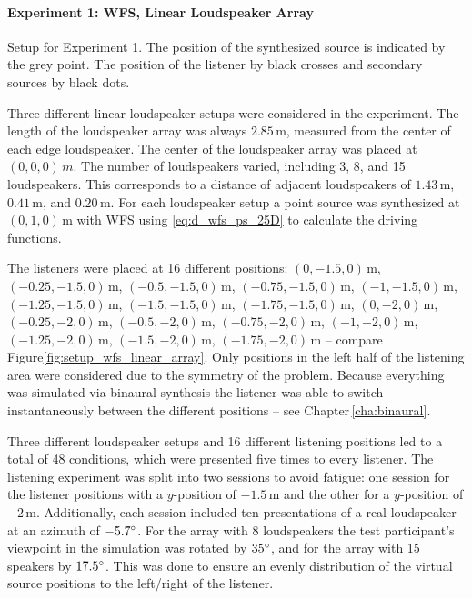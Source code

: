 \paragraph{Experiment 1: \ac{WFS}, Linear Loudspeaker Array}
\label{sec:experiment1_wfs_linear_array}
%
\begin{marginfigure}
    \ft
    
    \caption{Setup for Experiment 1. The position of the synthesized
    source is indicated by the grey point. The position of the listener by black
    crosses and secondary sources by black dots.
        }
    \label{fig:setup_wfs_linear_array}
\end{marginfigure}
%
Three different linear loudspeaker setups were considered in the experiment. The
length of the loudspeaker array was always $2.85$\,m, measured from the center
of each edge loudspeaker. The center of the loudspeaker array was placed at
$(0,0,0)\,m$. The number of loudspeakers varied,
including 3, 8, and 15 loudspeakers. This corresponds to a distance of
adjacent loudspeakers of $1.43$\,m, $0.41$\,m, and $0.20$\,m. For each loudspeaker
setup a point source was synthesized at $(0,1,0)$\,m with \ac{WFS}
using \eqref{eq:d_wfs_ps_25D} to calculate the driving functions.

The listeners were placed at 16 different positions: $(0,-1.5,0)$\,m,
$(-0.25,-1.5,0)$\,m, $(-0.5,-1.5,0)$\,m, $(-0.75,-1.5,0)$\,m,
$(-1,-1.5,0)$\,m,
$(-1.25,-1.5,0)$\,m, $(-1.5,-1.5,0)$\,m, $(-1.75,-1.5,0)$\,m, $(0,-2,0)$\,m,
$(-0.25,-2,0)$\,m, $(-0.5,-2,0)$\,m, $(-0.75,-2,0)$\,m, $(-1,-2,0)$\,m,
\linebreak
$(-1.25,-2,0)$\,m, $(-1.5,-2,0)$\,m, $(-1.75,-2,0)$\,m  -- compare
Figure\ref{fig:setup_wfs_linear_array}.
Only positions in the left half of the listening area were considered due to the
symmetry of the problem.
Because everything was simulated via
binaural synthesis the listener was able to switch instantaneously between the
different positions -- see Chapter\,\ref{cha:binaural}.

Three different loudspeaker setups and 16 different listening positions
led to a total of 48 conditions, which were presented five times to every
listener. The listening experiment was split into two sessions to avoid fatigue:
one session for the listener positions with a $y$-position of $-1.5$\,m and
the other for a $y$-position of $-2$\,m. Additionally, each session
included ten presentations of a real loudspeaker at an azimuth of
$-5.7^\circ$.
For the array with 8 loudspeakers the test participant's viewpoint in the simulation
was rotated by $35^\circ$, and for the array with 15 speakers by $17.5^\circ$.
This was done to ensure
an evenly distribution of the virtual source positions to the left/right of the
listener.

